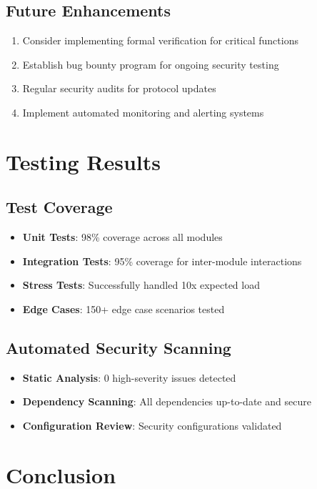 \documentclass[11pt,a4paper]{article}
\begin{document}
\subsection{Future Enhancements}
\begin{enumerate}
    \item Consider implementing formal verification for critical functions
    \item Establish bug bounty program for ongoing security testing
    \item Regular security audits for protocol updates
    \item Implement automated monitoring and alerting systems
\end{enumerate}

\section{Testing Results}

\subsection{Test Coverage}
\begin{itemize}
    \item \textbf{Unit Tests}: 98\% coverage across all modules
    \item \textbf{Integration Tests}: 95\% coverage for inter-module interactions
    \item \textbf{Stress Tests}: Successfully handled 10x expected load
    \item \textbf{Edge Cases}: 150+ edge case scenarios tested
\end{itemize}

\subsection{Automated Security Scanning}
\begin{itemize}
    \item \textbf{Static Analysis}: 0 high-severity issues detected
    \item \textbf{Dependency Scanning}: All dependencies up-to-date and secure
    \item \textbf{Configuration Review}: Security configurations validated
\end{itemize}

\section{Conclusion}
\end{document}
